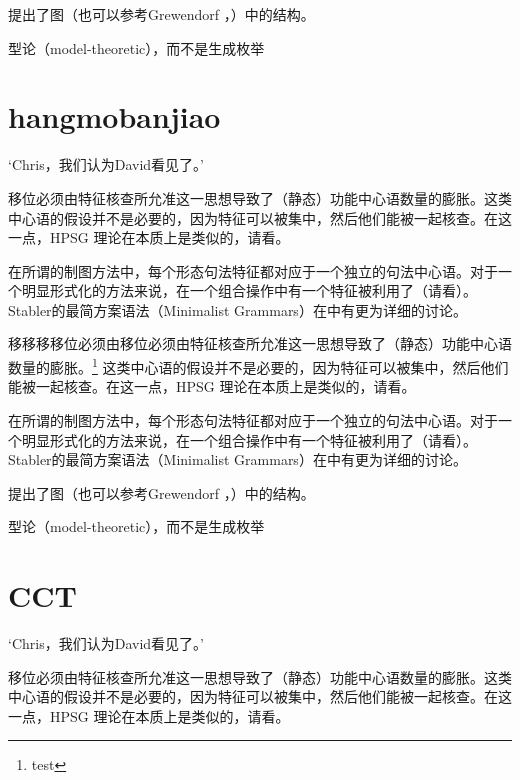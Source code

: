\documentclass{scrbook}
\let\citew\citealp
\newcommand{\page}{}
\begin{document}
\citet[\page 297]{Rizzi97a-u}提出了图（也可以参考Grewendorf \citeyear[\page 85, 240]{Grewendorf2002a}，\citeyear{Grewendorf2009a}）中的结构。

型论（model-theoretic），而不是生成枚举


\section{hangmobanjiao}


    `Chris，我们认为David看见了。'

移位必须由特征核查所允准这一思想导致了（静态）功能中心语数量的膨胀。这类中心语的假设并不是必要的，因为特征可以被集中，然后他们能被一起核查。在这一点，HPSG 理论在本质上是类似的，请看\citew[\S~II.3.3.4, \S~II.4.2]{Sternefeld2006a-u}。

在所谓的制图方法中，每个形态句法特征都对应于一个独立的句法中心语\citep[\page 54, 61]{CR2010a}。对于一个明显形式化的方法来说，在一个组合操作中有一个特征被利用了（请看\citew[\page 335]{Stabler2001a}）。Stabler的最简方案语法（Minimalist Grammars）在中有更为详细的讨论。

移移移移位必须由移位必须由特征核查所允准这一思想导致了（静态）功能中心语数量的膨胀。\footnote{test} 这类中心语的假设并不是必要的，因为特征可以被集中，然后他们能被一起核查。在这一点，HPSG 理论在本质上是类似的，请看\citew[\S~II.3.3.4, \S~II.4.2]{Sternefeld2006a-u}。

在所谓的制图方法中，每个形态句法特征都对应于一个独立的句法中心语\citep[\page 54, 61]{CR2010a}。对于一个明显形式化的方法来说，在一个组合操作中有一个特征被利用了（请看\citew[\page 335]{Stabler2001a}）。Stabler的最简方案语法（Minimalist Grammars）在中有更为详细的讨论。

\citet[\page 297]{Rizzi97a-u}提出了图（也可以参考Grewendorf \citeyear[\page 85, 240]{Grewendorf2002a}，\citeyear{Grewendorf2009a}）中的结构。

型论（model-theoretic），而不是生成枚举


\section{CCT}

    `Chris，我们认为David看见了。'

移位必须由特征核查所允准这一思想导致了（静态）功能中心语数量的膨胀。这类中心语的假设并不是必要的，因为特征可以被集中，然后他们能被一起核查。在这一点，HPSG 理论在本质上是类似的，请看\citew[\S~II.3.3.4, \S~II.4.2]{Sternefeld2006a-u}。
\end{document}
